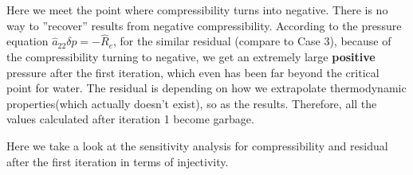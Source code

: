 \documentclass[11pt]{article}
\begin{document}
    Here we meet the point where compressibility turns into negative. There is
    no way to ''recover'' results from negative compressibility. According
    to the pressure equation $\hat{a}_{22}\delta p = -\hat{R}_e$, for the similar
    residual (compare to Case 3), because of the compressibility turning to negative,
    we get an extremely large \textbf{positive} pressure after the first iteration,
    which even has been far beyond the critical point for water. The residual is
    depending on how we extrapolate thermodynamic properties(which actually
    doesn't exist), so as the results. Therefore, all the values calculated after
    iteration 1 become garbage.

\newpage

    Here we take a look at the sensitivity analysis for compressibility and residual
    after the first iteration in terms of injectivity.
\end{document}
